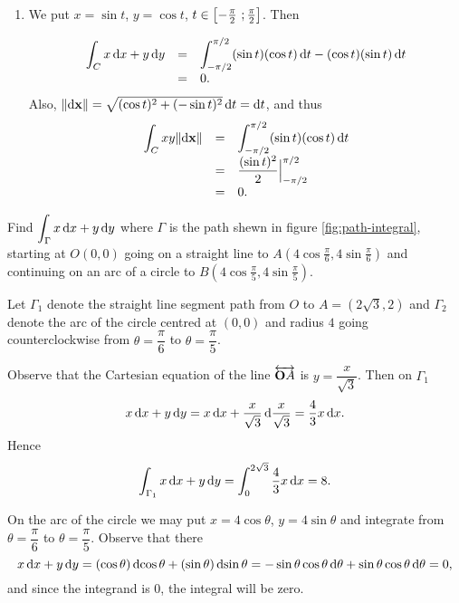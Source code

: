 \begin{multicols}{2}
\begin{problem}
\begin{answer}
\begin{enumerate}
\item We put $x=\sin t$, $y = \cos t$, $t\in\left[-\frac{\pi}{2} \ ; \frac{\pi}{2} \right]$. Then

$$
\begin{array}{lll}
\dint _C x\d{x}+y\d{y} & = & \dint _{-\pi/2} ^{\pi/2}
(\sin t)(\cos t)\d{t}-(\cos t)(\sin t)\d{t}\\
& = & 0.
\end{array}
$$
Also, $\norm{\d{\point{x}}}=\sqrt{(\cos t)^2+(-\sin
t)^2}\d{t}=\d{t}$, and thus
$$
\begin{array}{lll}
\dint _C xy \norm{\d{\point{x}}}& = & \dint _{-\pi/2} ^{\pi/2} (\sin
t)(\cos t) \d{t}\\
& = & \dfrac{(\sin t)^2}{2}\Big| _{-\pi/2} ^{\pi/2} \\
& = & 0.
\end{array}
$$
\end{enumerate}
\end{answer}
\end{problem}


\begin{problem}
\label{pro:path-integral}  Find $\dint _{\Gamma} x\d{x} + y\d{y} $
where $\Gamma$ is the path shewn in figure \ref{fig:path-integral},
starting at  $O(0,0)$ going on a straight line to $A\left(4\cos
\tfrac{\pi}{6}, 4\sin \tfrac{\pi}{6}\right)$ and continuing on an
arc of a circle to $B\left(4\cos \tfrac{\pi}{5}, 4\sin
\tfrac{\pi}{5}\right)$.
\begin{answer}
Let $\Gamma _1$ denote the straight line segment path from $O$ to
$A=(2\sqrt{3},2)$ and $\Gamma _2$ denote the arc of the circle
centred at $(0,0)$ and radius $4$ going counterclockwise from
$\theta=\dfrac{\pi}{6}$ to  $\theta=\dfrac{\pi}{5}$.

\bigskip

Observe that the Cartesian equation of the line  $\overleftrightarrow{{\mathbf OA}}$ is $y
=\dfrac{x}{\sqrt{3}}$. Then on $\Gamma _1$
$$x\d{x} + y\d{y} = x\d{x}+ \dfrac{x}{\sqrt{3}}\d{\dfrac{x}{\sqrt{3}}} = \dfrac{4}{3}x\d{x}.$$
Hence $$\dint _{\Gamma _1} x\d{x} + y\d{y} = \dint _0 ^{2\sqrt{3}}
\dfrac{4}{3}x\d{x} = 8.
$$

On the arc of the circle we may put $x=4\cos \theta$, $y = 4\sin
\theta$ and integrate from $\theta = \dfrac{\pi}{6}$ to $\theta =
\dfrac{\pi}{5}$. Observe that there
$$ x\d{x} + y\d{y} = (\cos \theta )\d{\cos \theta}  +(\sin\theta)\d{\sin \theta} = -\sin\theta\cos\theta\d{\theta}+\sin\theta\cos\theta\d{\theta}=0,$$
and since the integrand is $0$, the integral will be zero.


\end{answer}
\end{problem}
\end{multicols}
